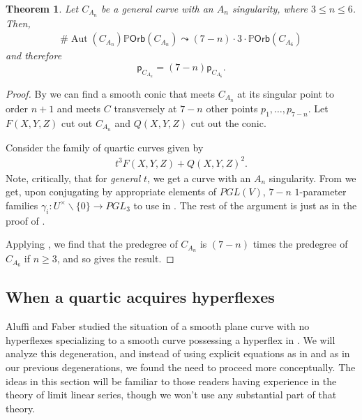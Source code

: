 \documentclass[12 pt, reqno]{amsart}
\newtheorem{thm}{Theorem}[section]
\theoremstyle{definition}
\newtheorem{rmk}[thm]{Remark}
\newcommand{\on}{\operatorname}
\newcommand{\mb}{\mathbb}
\renewcommand{\P}{\mb{P}}
\newcommand{\Orb}{\mathsf{Orb}}
\newcommand{\p}{\mathsf{p}}
\begin{document}
\begin{thm}
\label{Anorbit}
Let $C_{A_n}$ be a general curve with an $A_n$ singularity, where
$3\leq n\leq 6$. Then,
\begin{align*}
  \#\on{Aut}(C_{A_n}) \P \Orb({C_{A_n}})\leadsto (7-n) \cdot 3 \cdot \P \Orb({C_{A_6}})
\end{align*}
and therefore
\[\p_{C_{A_n}}=(7-n)\p_{C_{A_6}}.\]
\end{thm}



\begin{proof}
  By  we can find a smooth conic that meets $C_{A_n}$
  at its singular point to order $n+1$ and meets $C$ transversely at
  $7-n$ other points $p_1,\ldots,p_{7-n}$. Let $F(X,Y,Z)$ cut out
  $C_{A_n}$ and $Q(X,Y,Z)$ cut out the conic.

  Consider the family of quartic curves given by
\begin{align*}
    t^3 F(X,Y,Z)+Q(X,Y,Z)^2.
\end{align*}
Note, critically, that for {\sl general} $t$, we get a curve with an
$A_n$ singularity. From  we get, upon conjugating by
appropriate elements of $PGL(V)$, $7-n$ $1$-parameter families
$\gamma_i: U^{\times} \backslash\{0\}\to PGL_3$ to use in
. The rest of the argument is just as in the proof of
.

Applying \cite[Example 5.4]{AF00}, we find that the predegree of
$C_{A_n}$ is $(7-n)$ times the predegree of $C_{A_6}$ if $n\geq 3$,
and so  gives the result.
\end{proof}

\subsection{When a quartic acquires hyperflexes}
\label{sec:hyperflex}
Aluffi and Faber studied the situation of a smooth plane curve with no
hyperflexes specializing to a smooth curve possessing a hyperflex in
\cite[Theorem IV(2)]{AF93P}. We will analyze this degeneration, and
instead of using explicit equations as in \cite{AF93P} and as in our
previous degenerations, we found the need to proceed more
conceptually.  The ideas in this section will be familiar to those
readers having experience in the theory of limit linear series, though
we won't use any substantial part of that theory.
\end{document}
